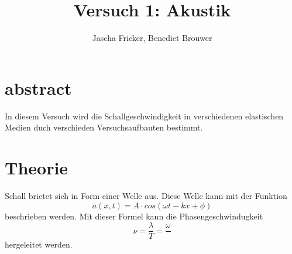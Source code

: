 \documentclass[11pt, a4paper]{article}
\title{Versuch 1: Akustik}
\author{Jascha Fricker, Benedict Brouwer}
\begin{document}
    \maketitle

    \section{abstract}
    In diesem Versuch wird die Schallgeschwindigkeit in verschiedenen elastischen Medien
    duch verschieden Versuchsaufbauten bestimmt.
    
    \section{Theorie}
    Schall brietet sich in Form einer Welle aus. Diese Welle kann mit der Funktion
    \begin{equation}
        a(x, t) = A \cdot cos(\omega t-kx+\phi )
    \end{equation}
    beschrieben werden. Mit dieser Formel kann die Phasengeschwindugkeit
    \begin{equation}
        \nu = \frac{\lambda}{T} = \frac{\omega}{}
    \end{equation}
    hergeleitet werden. 
\end{document}
